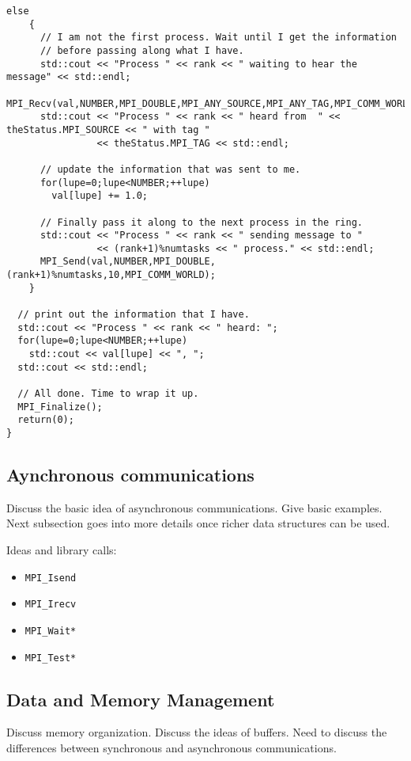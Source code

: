 \begin{lstlisting}[caption={Example of blocking communication.},
                   basicstyle=\scriptsize,
                   label=listing:blockingCommunication]
  else
    {
      // I am not the first process. Wait until I get the information
      // before passing along what I have.
      std::cout << "Process " << rank << " waiting to hear the message" << std::endl;
      MPI_Recv(val,NUMBER,MPI_DOUBLE,MPI_ANY_SOURCE,MPI_ANY_TAG,MPI_COMM_WORLD,&theStatus);
      std::cout << "Process " << rank << " heard from  " << theStatus.MPI_SOURCE << " with tag " 
                << theStatus.MPI_TAG << std::endl;

      // update the information that was sent to me.
      for(lupe=0;lupe<NUMBER;++lupe)
        val[lupe] += 1.0;

      // Finally pass it along to the next process in the ring.
      std::cout << "Process " << rank << " sending message to " 
                << (rank+1)%numtasks << " process." << std::endl;
      MPI_Send(val,NUMBER,MPI_DOUBLE,(rank+1)%numtasks,10,MPI_COMM_WORLD);
    }

  // print out the information that I have.
  std::cout << "Process " << rank << " heard: ";
  for(lupe=0;lupe<NUMBER;++lupe)
    std::cout << val[lupe] << ", ";
  std::cout << std::endl;

  // All done. Time to wrap it up.
  MPI_Finalize();
  return(0);
}
\end{lstlisting}

\subsection{Aynchronous communications}

Discuss the basic idea of asynchronous communications. Give basic
examples. Next subsection goes into more details once richer data
structures can be used.

Ideas and library calls: \\
\begin{itemize}
\item \texttt{MPI\_Isend}
\item \texttt{MPI\_Irecv}
\item \texttt{MPI\_Wait*}
\item \texttt{MPI\_Test*}
\end{itemize}

\subsection{Data and Memory Management}

Discuss memory organization. Discuss the ideas of buffers. Need to
discuss the differences between synchronous and asynchronous
communications.

